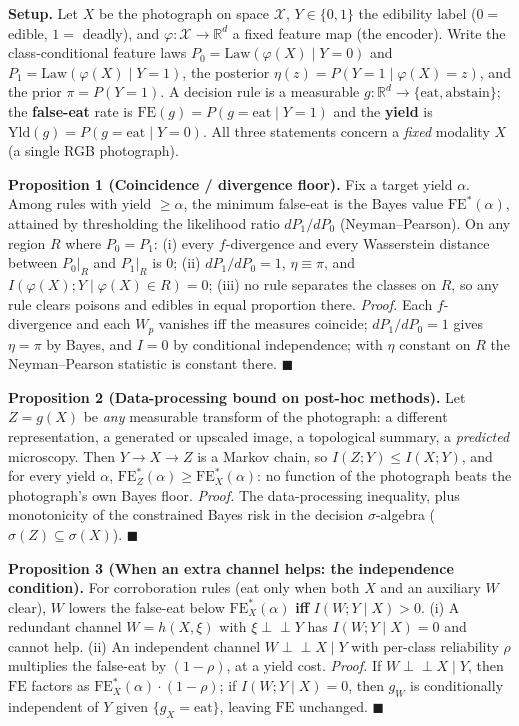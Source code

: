 \textbf{Setup.} Let \(X\) be the photograph on space \(\mathcal{X}\),
\(Y \in \{0,1\}\) the edibility label (\(0=\) edible, \(1=\) deadly),
and \(\varphi : \mathcal{X} \to \mathbb{R}^d\) a fixed feature map (the
encoder). Write the class-conditional feature laws
\(P_0 = \mathrm{Law}(\varphi(X)\mid Y{=}0)\) and
\(P_1 = \mathrm{Law}(\varphi(X)\mid Y{=}1)\), the posterior
\(\eta(z) = P(Y{=}1 \mid \varphi(X){=}z)\), and the prior
\(\pi = P(Y{=}1)\). A decision rule is a measurable
\(g : \mathbb{R}^d \to \{\text{eat},\text{abstain}\}\); the
\textbf{false-eat} rate is
\(\mathrm{FE}(g) = P(g{=}\text{eat}\mid Y{=}1)\) and the \textbf{yield}
is \(\mathrm{Yld}(g) = P(g{=}\text{eat}\mid Y{=}0)\). All three
statements concern a \emph{fixed} modality \(X\) (a single RGB
photograph).

\textbf{Proposition 1 (Coincidence / divergence floor).} Fix a target
yield \(\alpha\). Among rules with yield \(\ge \alpha\), the minimum
false-eat is the Bayes value \(\mathrm{FE}^*(\alpha)\), attained by
thresholding the likelihood ratio \(dP_1/dP_0\) (Neyman--Pearson). On
any region \(R\) where \(P_0 = P_1\): (i) every \(f\)-divergence and
every Wasserstein distance between \(P_0|_R\) and \(P_1|_R\) is \(0\);
(ii) \(dP_1/dP_0 = 1\), \(\eta \equiv \pi\), and
\(I(\varphi(X); Y \mid \varphi(X) \in R) = 0\); (iii) no rule separates
the classes on \(R\), so any rule clears poisons and edibles in equal
proportion there. \emph{Proof.} Each \(f\)-divergence and each \(W_p\)
vanishes iff the measures coincide; \(dP_1/dP_0 = 1\) gives
\(\eta = \pi\) by Bayes, and \(I = 0\) by conditional independence; with
\(\eta\) constant on \(R\) the Neyman--Pearson statistic is constant
there. \(\blacksquare\)

\textbf{Proposition 2 (Data-processing bound on post-hoc methods).} Let
\(Z = g(X)\) be \emph{any} measurable transform of the photograph: a
different representation, a generated or upscaled image, a topological
summary, a \emph{predicted} microscopy. Then \(Y \to X \to Z\) is a
Markov chain, so \(I(Z;Y) \le I(X;Y)\), and for every yield \(\alpha\),
\(\mathrm{FE}^*_Z(\alpha) \ge \mathrm{FE}^*_X(\alpha)\): no function of
the photograph beats the photograph's own Bayes floor. \emph{Proof.} The
data-processing inequality, plus monotonicity of the constrained Bayes
risk in the decision \(\sigma\)-algebra
(\(\sigma(Z) \subseteq \sigma(X)\)). \(\blacksquare\)

\textbf{Proposition 3 (When an extra channel helps: the independence
condition).} For corroboration rules (eat only when both \(X\) and an
auxiliary \(W\) clear), \(W\) lowers the false-eat below
\(\mathrm{FE}^*_X(\alpha)\) \textbf{iff} \(I(W; Y \mid X) > 0\). (i) A
redundant channel \(W = h(X, \xi)\) with \(\xi \perp\!\!\!\perp Y\) has
\(I(W;Y\mid X)=0\) and cannot help. (ii) An independent channel
\(W \perp\!\!\!\perp X \mid Y\) with per-class reliability \(\rho\)
multiplies the false-eat by \((1-\rho)\), at a yield cost. \emph{Proof.}
If \(W \perp\!\!\!\perp X \mid Y\), then \(\mathrm{FE}\) factors as
\(\mathrm{FE}^*_X(\alpha)\cdot(1-\rho)\); if \(I(W;Y\mid X)=0\), then
\(g_W\) is conditionally independent of \(Y\) given
\(\{g_X{=}\text{eat}\}\), leaving \(\mathrm{FE}\) unchanged.
\(\blacksquare\)

